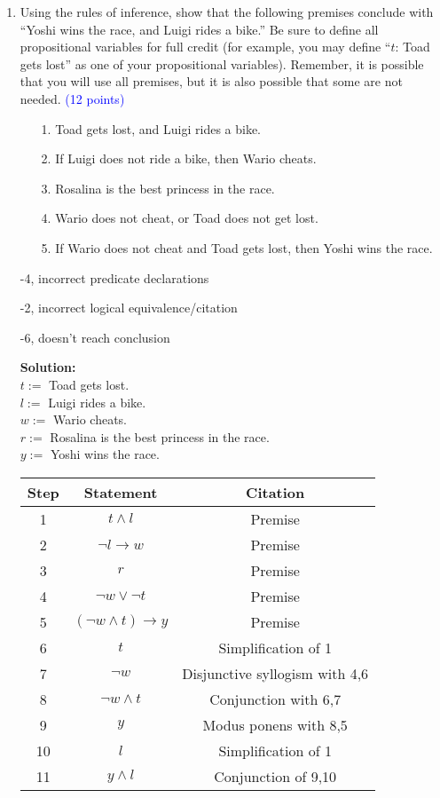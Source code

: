 \documentclass{article}
\newcommand{\pt}[1]{\textcolor{blue}{(#1 points)}}
\newenvironment{solution}
{
\par
\vspace{2mm}
\color{blue}
\textbf{Solution:}
}
{
\par
}
\newenvironment{rubric}
{
\par
\begin{spacing}{.6}
\begin{itshape}
\color{red}

}
{
\end{itshape}
\end{spacing}
\par
}
\begin{document}
\begin{enumerate}
\item Using the rules of inference, show that the following premises conclude with “Yoshi wins the race, and Luigi rides a bike.” Be sure to define all propositional variables for full credit (for example, you may define “$t$: Toad gets lost” as one of your propositional variables). Remember, it is possible that you will use all premises, but it is also possible that some are not needed. \pt{12}

\begin{enumerate}
    \item[1.] Toad gets lost, and Luigi rides a bike.
    \item[2.] If Luigi does not ride a bike, then Wario cheats.
    \item[3.] Rosalina is the best princess in the race.
    \item[4.] Wario does not cheat, or Toad does not get lost.
    \item[5.] If Wario does not cheat and Toad gets lost, then Yoshi wins the race.
\end{enumerate}

\begin{rubric}
-4, incorrect predicate declarations

-2, incorrect logical equivalence/citation

-6, doesn't reach conclusion
\end{rubric}

\begin{solution}\\
$t :=$ Toad gets lost.\\
$l :=$ Luigi rides a bike.\\
$w :=$ Wario cheats.\\
$r :=$ Rosalina is the best princess in the race.\\
$y :=$ Yoshi wins the race.\\
\begin{center}
\begin{tabular}{c|c|c}
    Step & Statement & Citation\\
    \hline
    1 & $t \land l$ & Premise \\
    2 & $\neg l \rightarrow w$ & Premise \\
    3 & $r$ & Premise \\
    4 & $\neg w \lor \neg t$ & Premise \\
    5 & $(\neg w \land t) \rightarrow y$& Premise \\
    6 & $t$ & Simplification of 1 \\
    7 & $\neg w$ & Disjunctive syllogism with 4,6 \\
    8 & $\neg w \land t$ & Conjunction with 6,7 \\
    9 & $y$ & Modus ponens with 8,5 \\
    10 & $l$ & Simplification of 1 \\
    11 & $y \land l$ & Conjunction of 9,10
\end{tabular}
\end{center}
\end{solution}


\end{enumerate}
\end{document}
